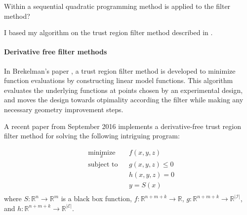 \documentclass{article}
\begin{document}
Within \cite{DUMMY:sqp_filter} a sequential quadratic programming method is applied to the filter method?


I based my algorithm on the trust region filter method described in \cite{DUMMY:SQPFilter}.


\paragraph{Derivative free filter methods}

In Brekelman's paper \cite{DUMMY:Brekelman}, a trust region filter method is developed to minimize function evaluations by constructing linear model functions.
This algorithm evaluates the underlying functions at points chosen by an experimental design, 
and moves the design towards otpimality according the filter while making any necessary geometry improvement steps.


A recent paper from September 2016 \cite{DUMMY:Biegler} implements a derivative-free trust region filter method for solving the following intriguing program:

\begin{equation*}
\begin{aligned}
& \underset{x}{\text{minimize}} & & f(x, y, z) \\
& \text{subject to} & & g(x, y, z) \leq 0 \\
& & & h(x, y, z) = 0 \\
& & & y = S(x) \;  \\
\end{aligned}
\end{equation*}
where
$S : \mathbb{R}^n \to \mathbb{R}^m$ is a black box function,
$f : \mathbb{R}^{n+m+k} \to \mathbb{R}$,
$g : \mathbb{R}^{n+m+k} \to \mathbb{R}^{|\mathcal{I}|}$, and
$h : \mathbb{R}^{n+m+k} \to \mathbb{R}^{|\mathcal{E}|}$.
\end{document}
